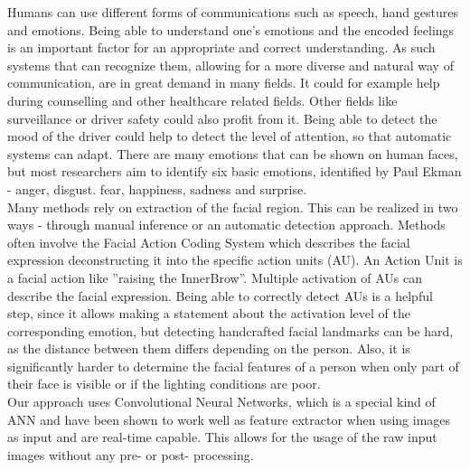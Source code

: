 Humans can use different forms of communications such as speech, hand gestures and emotions. Being able to understand one’s emotions and the encoded feelings is an important factor for an appropriate and correct understanding. As such systems that can recognize them, allowing for a more diverse and natural way of communication, are in great demand in many fields. It could for example help during counselling and other healthcare related fields. Other fields like surveillance or driver safety could also profit from it. Being able to detect the mood of the driver could help to detect the level of attention, so that automatic systems can adapt. There are many emotions that can be shown on human faces, but most researchers aim to identify six basic emotions, identified by Paul Ekman - anger, disgust. fear, happiness, sadness and surprise.\\

Many methods rely on extraction of the facial region. This can be realized in two ways - through manual inference or an automatic detection approach. Methods often involve the Facial Action Coding System which describes the facial expression deconstructing it into the specific action units (AU). An Action Unit is a facial action like ”raising the InnerBrow”. Multiple activation of AUs can describe the facial expression. Being able to correctly detect AUs is a helpful step, since it allows making a statement about the activation level of the corresponding emotion, but detecting handcrafted facial landmarks can be hard, as the distance between them differs depending on the person. Also, it is significantly harder to determine the facial features of a person when only part of their face is visible or if the lighting conditions are poor.\\

Our approach uses Convolutional Neural Networks, which is a special kind of ANN and have been shown to work well as feature extractor when using images as input and are real-time capable. This allows for the usage of the raw input images without any pre- or post- processing.\\
